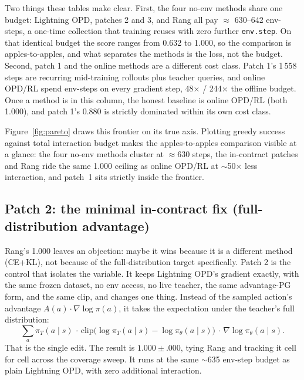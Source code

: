 \documentclass[11pt]{article}
\newcommand{\code}[1]{\texttt{#1}}
\begin{document}
Two things these tables make clear. First, the four no-env methods share one budget:
Lightning OPD, patches 2 and 3, and Rang all pay $\approx$ 630--642 env-steps, a
one-time collection that training reuses with zero further \code{env.step}. On that
identical budget the score ranges from 0.632 to 1.000, so the comparison is
apples-to-apples, and what separates the methods is the loss, not the budget. Second,
patch 1 and the online methods are a different cost class. Patch 1's 1\,558 steps are
recurring mid-training rollouts plus teacher queries, and online OPD/RL spend
env-steps on every gradient step, 48$\times$ / 244$\times$ the offline budget. Once a
method is in this column, the honest baseline is online OPD/RL (both 1.000), and patch
1's 0.880 is strictly dominated within its own cost class.

Figure~\ref{fig:pareto} draws this frontier on its true axis. Plotting greedy success
against total interaction budget makes the apples-to-apples comparison visible at a
glance: the four no-env methods cluster at $\approx$630 steps, the in-contract patches
and Rang ride the same 1.000 ceiling as online OPD/RL at $\sim$50$\times$ less
interaction, and patch~1 sits strictly inside the frontier.

\subsection{Patch 2: the minimal in-contract fix (full-distribution advantage)}
\label{sec:patch2}

Rang's 1.000 leaves an objection: maybe it wins because it is a different method
(CE+KL), not because of the full-distribution target specifically. Patch 2 is the
control that isolates the variable. It keeps Lightning OPD's gradient
exactly, with the same frozen dataset, no env access, no live teacher, the same
advantage-PG form, and the same clip, and changes one thing. Instead of the sampled
action's advantage $A(a)\cdot\nabla\log\pi(a)$, it takes the expectation under the
teacher's full distribution:
\[
\sum_a \pi_T(a\mid s)\,\cdot\,\mathrm{clip}\bigl(\log\pi_T(a\mid s) - \log\pi_\theta(a\mid s)\bigr)\,\cdot\,\nabla\log\pi_\theta(a\mid s).
\]
That is the single edit. The result is $1.000 \pm .000$, tying Rang and tracking it
cell for cell across the coverage sweep. It runs at the same $\sim$635 env-step
budget as plain Lightning OPD, with zero additional interaction.
\end{document}
